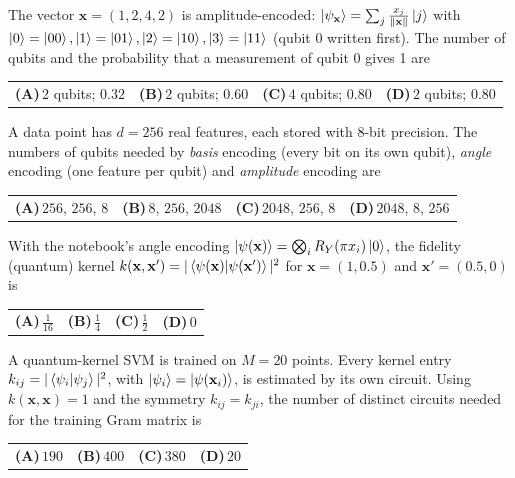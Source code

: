 \documentclass[11pt,a4paper]{article}
\newcommand{\optlabel}[1]{\textbf{(#1)}}
\newenvironment{qitem}[1]{\begin{list}{}{\setlength{\leftmargin}{3.3em}\setlength{\labelwidth}{3.1em}%
  \setlength{\labelsep}{0.2em}\setlength{\topsep}{3pt}\setlength{\parsep}{3pt}}\item[\textbf{Q.#1}\hfill]}{\end{list}}
\newcommand{\qsep}{\par\vspace{2pt}{\color{black!15}\hrule}\vspace{4pt}}
\begin{document}
\begin{qitem}{42}
The vector $\mathbf x = (1, 2, 4, 2)$ is amplitude-encoded: $\ket{\psi_{\mathbf x}} = \sum_j \frac{x_j}{\|\mathbf x\|}\ket j$ with
$\ket0 = \ket{00}, \ket1 = \ket{01}, \ket2 = \ket{10}, \ket3 = \ket{11}$ (qubit 0 written first). The number of qubits and the
probability that a measurement of qubit 0 gives 1 are
\par\smallskip\noindent\begin{tabularx}{\linewidth}{@{}*{4}{L}@{}}
\optlabel{A}\,$2$ qubits; $0.32$ & \optlabel{B}\,$2$ qubits; $0.60$ & \optlabel{C}\,$4$ qubits; $0.80$ & \optlabel{D}\,$2$ qubits; $0.80$
\end{tabularx}
\end{qitem}
\qsep

\begin{qitem}{43}
A data point has $d = 256$ real features, each stored with 8-bit precision. The numbers of qubits needed by
\emph{basis} encoding (every bit on its own qubit), \emph{angle} encoding (one feature per qubit) and \emph{amplitude} encoding are
\par\smallskip\noindent\begin{tabularx}{\linewidth}{@{}*{4}{L}@{}}
\optlabel{A}\,$256$, $256$, $8$ & \optlabel{B}\,$8$, $256$, $2048$ & \optlabel{C}\,$2048$, $256$, $8$ & \optlabel{D}\,$2048$, $8$, $256$
\end{tabularx}
\end{qitem}
\qsep

\begin{qitem}{44}
With the notebook's angle encoding $\ket{\psi(\mathbf x)} = \bigotimes_i R_Y(\pi x_i)\ket0$, the fidelity (quantum) kernel
$k(\mathbf x, \mathbf x') = |\braket{\psi(\mathbf x)|\psi(\mathbf x')}|^2$ for $\mathbf x = (1, 0.5)$ and $\mathbf x' = (0.5, 0)$ is
\par\smallskip\noindent\begin{tabularx}{\linewidth}{@{}*{4}{L}@{}}
\optlabel{A}\,$\frac1{16}$ & \optlabel{B}\,$\frac14$ & \optlabel{C}\,$\frac12$ & \optlabel{D}\,$0$
\end{tabularx}
\end{qitem}
\qsep

\begin{qitem}{45}
A quantum-kernel SVM is trained on $M = 20$ points. Every kernel entry $k_{ij} = |\braket{\psi_i|\psi_j}|^2$, with $\ket{\psi_i} = \ket{\psi(\mathbf x_i)}$,
is estimated by its own circuit. Using $k(\mathbf x, \mathbf x) = 1$ and the symmetry $k_{ij} = k_{ji}$, the number of distinct
circuits needed for the training Gram matrix is
\par\smallskip\noindent\begin{tabularx}{\linewidth}{@{}*{4}{L}@{}}
\optlabel{A}\,$190$ & \optlabel{B}\,$400$ & \optlabel{C}\,$380$ & \optlabel{D}\,$20$
\end{tabularx}
\end{qitem}
\qsep
\end{document}
